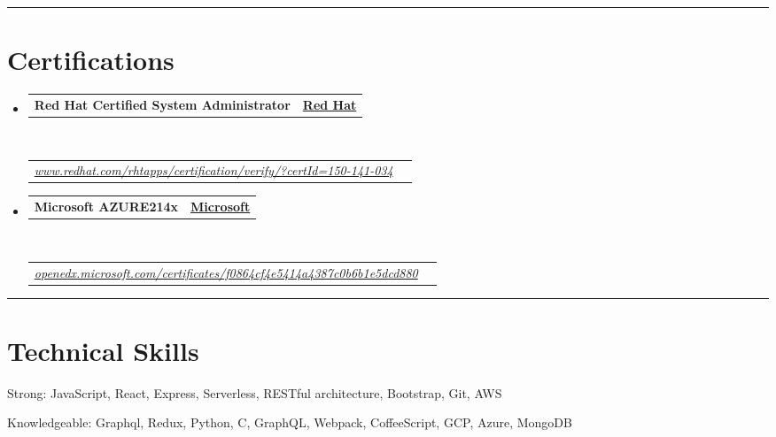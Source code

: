 \documentclass[10pt,a4paper,hidelinks]{article}
\makeatletter
\newenvironment{indentsection}[1]%
{\begin{list}{}%
	{\setlength{\leftmargin}{#1}}%
	\item[]%
}
{\end{list}}
\newcommand{\headerrow}[2]
{\begin{tabular*}{\linewidth}{l@{\extracolsep{\fill}}r}
	#1 &
	#2 \\
\end{tabular*}}
\makeatother
\begin{document}
\hrule
\vspace{-0.4em}
\section*{Certifications}

\begin{itemize}
	\parskip=0.1em

	\item 
	\headerrow
		{\textbf{Red Hat Certified System Administrator}}
		{{\href{https://www.redhat.com/}{\textbf{Red Hat}}}}
	\\
	\headerrow
	    {\emph{\href{https://www.redhat.com/rhtapps/certification/verify/?certId=150-141-034}{www.redhat.com/rhtapps/certification/verify/?certId=150-141-034}}}
		{\emph{}}
	
	\item 
	\headerrow
		{\textbf{Microsoft AZURE214x}}
		{{\href{https://www.microsoft.com/}{\textbf{Microsoft}}}}
	\\
	\headerrow
	    {\emph{\href{https://openedx.microsoft.com/certificates/f0864cf4e5414a4387c0b6b1e5dcd880}{openedx.microsoft.com/certificates/f0864cf4e5414a4387c0b6b1e5dcd880}}}
		{\emph{}}

\end{itemize}


\hrule
\vspace{-0.4em}
\section*{Technical Skills}

\begin{indentsection}{\parindent}
\begin{description*}
	\item[Strong:]
	JavaScript, React, Express, Serverless, RESTful architecture, Bootstrap, Git, AWS
	\item[Knowledgeable:]
	Graphql, Redux, Python, C, GraphQL, Webpack, CoffeeScript, GCP, Azure, MongoDB
\end{description*}
\end{indentsection}
\end{document}
